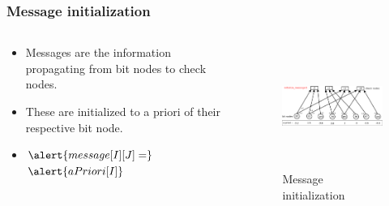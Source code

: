 \documentclass[xcolor=dvipsname]
{beamer}
\begin{document}
\begin{frame}[t]
\frametitle{ Message initialization }  
\begin{columns}[totalwidth=\textwidth]
	\begin{column}{0.4\textwidth}
	\centering
	\begin{itemize}
	\item Messages are the information propagating from bit nodes to check nodes.
	\item These are initialized to a priori of their respective bit node.	
	\item 	$ \alert{message[I][J] =} 
	$
	$
	\alert{aPriori[I]} 
	$ 
	\end{itemize}
 
			
	\end{column}%
	   		
	\begin{column}{0.6\textwidth}
	\centering
	\begin{figure}
	\includegraphics[height=4cm,width=7cm]{minSum3}
	\caption{ Message initialization }
	\end{figure}
	\end{column}%
\end{columns}
\end{frame}

\end{document}

